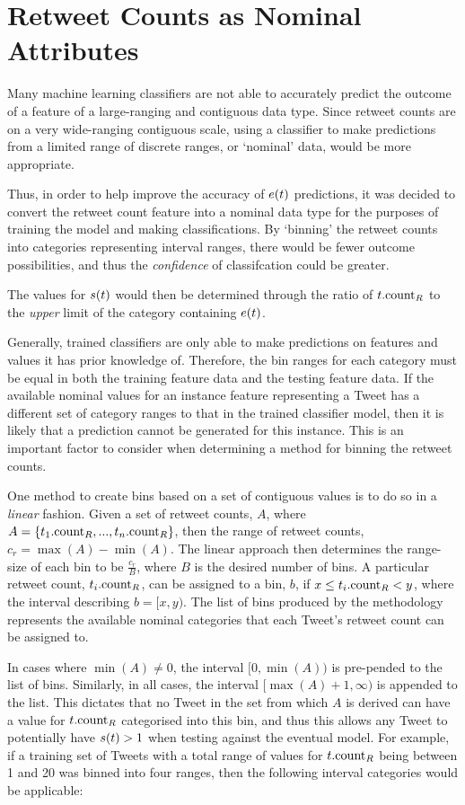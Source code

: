 \section{Retweet Counts as Nominal Attributes}
Many machine learning classifiers are not able to accurately predict the outcome of a feature of a large-ranging and contiguous data type. Since retweet counts are on a very wide-ranging contiguous scale, using a classifier to make predictions from a limited range of discrete ranges, or `nominal' data, would be more appropriate.

Thus, in order to help improve the accuracy of $e(t)$ predictions, it was decided to convert the retweet count feature into a nominal data type for the purposes of training the model and making classifications. By `binning' the retweet counts into categories representing interval ranges, there would be fewer outcome possibilities, and thus the \textit{confidence} of classifcation could be greater.

The values for $s(t)$ would then be determined through the ratio of $t.\textrm{count}_R$ to the \textit{upper} limit of the category containing $e(t)$.

Generally, trained classifiers are only able to make predictions on features and values it has prior knowledge of. Therefore, the bin ranges for each category must be equal in both the training feature data and the testing feature data. If the available nominal values for an instance feature representing a Tweet has a different set of category ranges to that in the trained classifier model, then it is likely that a prediction cannot be generated for this instance. This is an important factor to consider when determining a method for binning the retweet counts.

One method to create bins based on a set of contiguous values is to do so in a \textit{linear} fashion. Given a set of retweet counts, $A$, where $A = \left\{t_1.\textrm{count}_R, ..., t_n.\textrm{count}_R\right\}$, then the range of retweet counts, $c_r = \max({A}) - \min({A})$. The linear approach then determines the range-size of each bin to be $\frac{c_r}{B}$, where $B$ is the desired number of bins. A particular retweet count, $t_i.\textrm{count}_R$, can be assigned to a bin, $b$, if $x \leq t_i.\textrm{count}_R < y$, where the interval describing $b = [x,y)$. The list of bins produced by the methodology represents the available nominal categories that each Tweet's retweet count can be assigned to.

In cases where $\min({A}) \neq 0$, the interval $[0,\min({A}))$ is pre-pended to the list of bins. Similarly, in all cases, the interval $[\max({A})+1,\infty)$ is appended to the list. This dictates that no Tweet in the set from which $A$ is derived can have a value for $t.\textrm{count}_R$ categorised into this bin, and thus this allows any Tweet to potentially have $s(t) > 1$ when testing against the eventual model. For example, if a training set of Tweets with a total range of values for $t.\textrm{count}_R$ being between 1 and 20 was binned into four ranges, then the following interval categories would be applicable:

